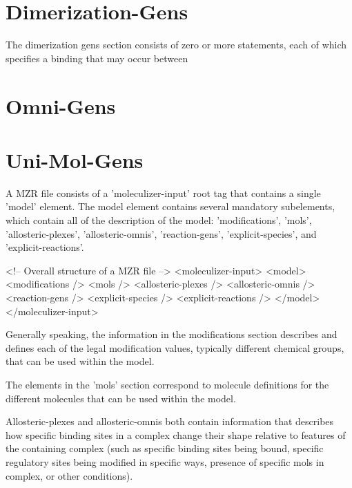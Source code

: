 \section{Dimerization-Gens}
The dimerization gens section consists of zero or more statements,
each of which specifies a binding that may occur between 

\section{Omni-Gens}
\section{Uni-Mol-Gens}
























A MZR file consists of a 'moleculizer-input' root tag that contains a
single 'model' element.  The model element contains several mandatory
subelements, which contain all of the description of the model:
'modifications', 'mols', 'allosteric-plexes', 'allosteric-omnis',
'reaction-gens', 'explicit-species', and 'explicit-reactions'. 

\begin{ExampleXML}[caption=Overall structure of a MZR file, label=overallmzrstruct]
<!-- Overall structure of a MZR file -->
<moleculizer-input>
  <model>
    <modifications />
    <mols />
    <allosteric-plexes />
    <allosteric-omnis />
    <reaction-gens />
    <explicit-species />
    <explicit-reactions />
  </model>
</moleculizer-input>
\end{ExampleXML}

Generally speaking, the information in the modifications section
describes and defines each of the legal modification values, typically
different chemical groups, that can be used within the model.  

The elements in the 'mols' section correspond to molecule definitions for
the different molecules that can be used within the model.

Allosteric-plexes and allosteric-omnis both contain information that
describes how specific binding sites in a complex change their shape
relative to features of the containing complex (such as specific
binding sites being bound, specific regulatory sites being modified in
specific ways, presence of specific mols in complex, or other
conditions).  

